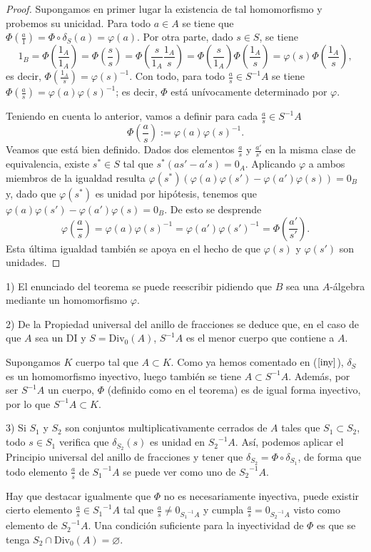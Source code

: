 \documentclass[../main.tex]{subfiles}
\begin{document}
	\begin{proof}
		Supongamos en primer lugar la existencia de tal homomorfismo y probemos su unicidad. Para todo $a\in A$ se tiene que $\Phi(\frac{a}{1})=\Phi\circ\delta_S(a)=\varphi(a)$. Por otra parte, dado $s\in S$, se tiene
		$$1_B=\Phi\left(\frac{1_A}{1_A}\right)=\Phi\left(\frac{s}{s}\right)=\Phi\left(\frac{s}{1_A}\frac{1_A}{s}\right)=\Phi\left(\frac{s}{1_A}\right)\Phi\left(\frac{1_A}{s}\right)=\varphi(s)\Phi\left(\frac{1_A}{s}\right),$$
		es decir, $\Phi(\frac{1_A}{s})={\varphi(s)}^{-1}$. Con todo, para todo $\frac{a}{s}\in S^{-1}A$ se tiene $\Phi(\frac{a}{s})=\varphi(a){\varphi(s)}^{-1}$; es decir, $\Phi$ está unívocamente determinado por $\varphi$.

		Teniendo en cuenta lo anterior, vamos a definir para cada $\frac{a}{s}\in S^{-1}A$
		$$\Phi\left(\frac{a}{s}\right):=\varphi(a){\varphi(s)}^{-1}.$$
		Veamos que está bien definido. Dados dos elementos $\frac{a}{s}$ y $\frac{a'}{s'}$ en la misma clase de equivalencia, existe $s^*\in S$ tal que $s^*(as'-a's)=0_A$. Aplicando $\varphi$ a ambos miembros de la igualdad resulta $\varphi(s^*)(\varphi(a)\varphi(s')-\varphi(a')\varphi(s))=0_B$ y, dado que $\varphi(s^*)$ es unidad por hipótesis, tenemos que $\varphi(a)\varphi(s')-\varphi(a')\varphi(s)=0_B$. De esto se desprende
		$$\varphi\left(\frac{a}{s}\right)=\varphi(a){\varphi(s)}^{-1}=\varphi(a'){\varphi(s')}^{-1}=\Phi\left(\frac{a'}{s'}\right).$$
		Esta última igualdad también se apoya en el hecho de que $\varphi(s)$ y $\varphi(s')$ son unidades.
	\end{proof}

	\begin{remark}
		1) El enunciado del teorema se puede reescribir pidiendo que $B$ sea una $A$-álgebra mediante un homomorfismo $\varphi$.

		2) De la Propiedad universal del anillo de fracciones se deduce que, en el caso de que $A$ sea un DI y $S=\operatorname{Div_0}(A)$, $S^{-1}A$ es el menor cuerpo que contiene a $A$.

		Supongamos $K$ cuerpo tal que $A\subset K$. Como ya hemos comentado en ($\ref{iny}$), $\delta_S$ es un homomorfismo inyectivo, luego también se tiene $A\subset S^{-1}A$. Además, por ser $S^{-1}A$ un cuerpo, $\Phi$ (definido como en el teorema) es de igual forma inyectivo, por lo que $S^{-1}A\subset K$.

		3) Si $S_1$ y $S_2$ son conjuntos multiplicativamente cerrados de $A$ tales que $S_1\subset S_2$, todo $s\in S_1$ verifica que $\delta_{S_2}(s)$ es unidad en ${S_2}^{-1}A$. Así, podemos aplicar el Principio universal del anillo de fracciones y tener que $\delta_{S_2}=\Phi\circ\delta_{S_1}$, de forma que todo elemento $\frac{a}{s}$ de ${S_1}^{-1}A$ se puede ver como uno de ${S_2}^{-1}A$.

		Hay que destacar igualmente que $\Phi$ no es necesariamente inyectiva, puede existir cierto elemento $\frac{a}{s}\in{S_1}^{-1}A$ tal que $\frac{a}{s}\neq0_{{S_1}^{-1}A}$ y cumpla $\frac{a}{s}=0_{{S_2}^{-1}A}$ visto como elemento de ${S_2}^{-1}A$. Una condición suficiente para la inyectividad de $\Phi$ es que se tenga $S_2\cap\operatorname{Div_0}(A)=\varnothing$.
	\end{remark}
\end{document}
